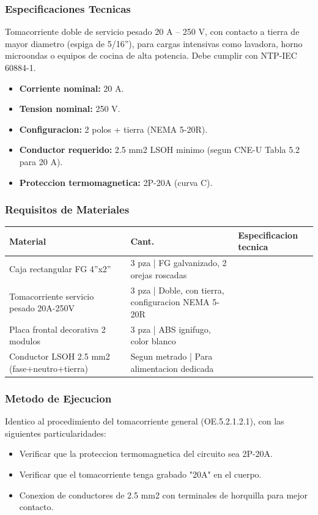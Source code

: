 \subsubsection{Especificaciones Tecnicas}

Tomacorriente doble de servicio pesado 20 A -- 250 V, con contacto a tierra de mayor diametro (espiga de 5/16''), para cargas intensivas como lavadora, horno microondas o equipos de cocina de alta potencia. Debe cumplir con NTP-IEC 60884-1.

\begin{itemize}[nosep]
  \item \textbf{Corriente nominal:} 20 A.
  \item \textbf{Tension nominal:} 250 V.
  \item \textbf{Configuracion:} 2 polos + tierra (NEMA 5-20R).
  \item \textbf{Conductor requerido:} 2.5 mm2 LSOH minimo (segun CNE-U Tabla 5.2 para 20 A).
  \item \textbf{Proteccion termomagnetica:} 2P-20A (curva C).
\end{itemize}

\subsubsection{Requisitos de Materiales}

\begin{longtable}{L{5.0cm} L{2.0cm} L{7.5cm}}
\toprule
\textbf{Material} & \textbf{Cant.} & \textbf{Especificacion tecnica} \\
\midrule
Caja rectangular FG 4''x2'' & 3 pza | FG galvanizado, 2 orejas roscadas \\
Tomacorriente servicio pesado 20A-250V & 3 pza | Doble, con tierra, configuracion NEMA 5-20R \\
Placa frontal decorativa 2 modulos & 3 pza | ABS ignifugo, color blanco \\
Conductor LSOH 2.5 mm2 (fase+neutro+tierra) & Segun metrado | Para alimentacion dedicada \\
\bottomrule
\end{longtable}

\subsubsection{Metodo de Ejecucion}

Identico al procedimiento del tomacorriente general (OE.5.2.1.2.1), con las siguientes particularidades:
\begin{itemize}
  \item Verificar que la proteccion termomagnetica del circuito sea 2P-20A.
  \item Verificar que el tomacorriente tenga grabado "20A" en el cuerpo.
  \item Conexion de conductores de 2.5 mm2 con terminales de horquilla para mejor contacto.
\end{itemize}

